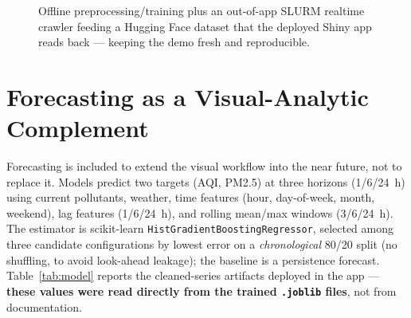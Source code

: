 \documentclass[a4paper]{article}
\begin{document}
\begin{figure}[H]
\centering
{}
\caption{Offline preprocessing/training plus an out-of-app SLURM realtime crawler feeding a Hugging Face
dataset that the deployed Shiny app reads back --- keeping the demo fresh and reproducible.}
\label{fig:arch}
\end{figure}

\section{Forecasting as a Visual-Analytic Complement}
Forecasting is included to extend the visual workflow into the near future, not to replace it. Models
predict two targets (AQI, PM2.5) at three horizons (1/6/24~h) using current pollutants, weather, time
features (hour, day-of-week, month, weekend), lag features (1/6/24~h), and rolling mean/max windows
(3/6/24~h). The estimator is scikit-learn \texttt{HistGradientBoostingRegressor}, selected among three
candidate configurations by lowest error on a \emph{chronological} 80/20 split (no shuffling, to avoid
look-ahead leakage); the baseline is a persistence forecast. Table~\ref{tab:model} reports the cleaned-series
artifacts deployed in the app --- \textbf{these values were read directly from the trained
\texttt{.joblib} files}, not from documentation.
\end{document}

